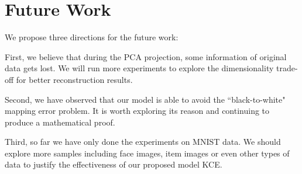 \documentclass[12pt]{report} %
\begin{document}
\section{Future Work}
We propose three directions for the future work:

First, we believe that during the PCA projection, some information of original data gets lost. We will run more experiments to explore the dimensionality trade-off for better reconstruction results.

Second, we have observed that our model is able to avoid the ``black-to-white" mapping error problem. It is worth exploring its reason and continuing to produce a mathematical proof.

Third, so far we have only done the experiments on MNIST data. We should explore more samples including face images, item images or even other types of data to justify the effectiveness of our proposed model KCE.
\end{document}

